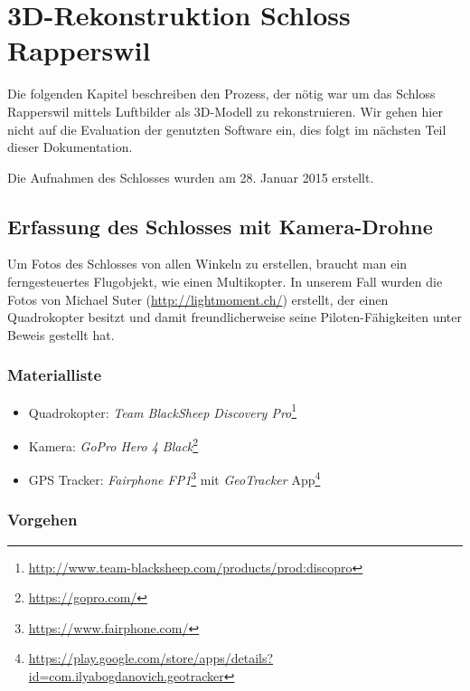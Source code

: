 \chapter{3D-Rekonstruktion Schloss Rapperswil}


Die folgenden Kapitel beschreiben den Prozess, der nötig war um das Schloss
Rapperswil mittels Luftbilder als 3D-Modell zu rekonstruieren. Wir gehen hier
nicht auf die Evaluation der genutzten Software ein, dies folgt im nächsten Teil
dieser Dokumentation.

Die Aufnahmen des Schlosses wurden am 28. Januar 2015 erstellt.


\section{Erfassung des Schlosses mit Kamera-Drohne}

\label{workflow:drone}

Um Fotos des Schlosses von allen Winkeln zu erstellen, braucht man ein
ferngesteuertes Flugobjekt, wie \zb{} einen Multikopter. In unserem Fall wurden
die Fotos von Michael Suter (\url{http://lightmoment.ch/}) erstellt, der einen
Quadrokopter besitzt und damit freundlicherweise seine Piloten-Fähigkeiten unter
Beweis gestellt hat.

\subsection{Materialliste}

\begin{itemize}
	\item Quadrokopter: \textit{Team BlackSheep Discovery
		Pro}\footnote{\url{http://www.team-blacksheep.com/products/prod:discopro}}
	\item Kamera: \textit{GoPro Hero 4 Black}\footnote{\url{https://gopro.com/}}
	\item GPS Tracker: \textit{Fairphone
		FP1}\footnote{\url{https://www.fairphone.com/}} mit
		\textit{GeoTracker}
		App\footnote{\url{https://play.google.com/store/apps/details?id=com.ilyabogdanovich.geotracker}}
\end{itemize}

\subsection{Vorgehen}

